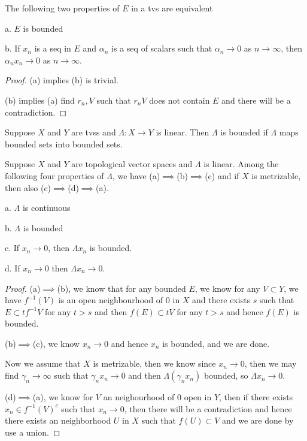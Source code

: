 \documentclass[lang=en, color=blue, ]{elegantbook}
\begin{document}
\begin{theorem}
    The following two properties of $E$ in a tvs are equivalent\par
    a. $E$ is bounded\par
    b. If $x_n$ is a seq in $E$ and $\alpha_n$ is a seq of scalars such that $\alpha_n \to 0$ as $n\to\infty$, then $\alpha_nx_n \to 0$ as $n\to\infty$.
\end{theorem}
\begin{proof}
    (a) implies (b) is trivial.\par
    (b) implies (a) find $r_n, V$ such that $r_nV$ does not contain $E$ and there will be a contradiction.
\end{proof}

\begin{definition}
    Suppose $X$ and $Y$ are tvss and $\Lambda:X\to Y$ is linear. Then $\Lambda$ is bounded if $\Lambda$ maps bounded sets into bounded sets.
\end{definition}

\begin{theorem}
    Suppose $X$ and $Y$ are topological vector spaces and $\Lambda$ is linear. Among the following four properties of $\Lambda$, we have (a)$\implies$(b)$\implies$(c) and if $X$ is metrizable, then also (c)$\implies$(d)$\implies$(a).\par
    a. $\Lambda$ is continuous\par
    b. $\Lambda$ is bounded\par
    c. If $x_n \to 0$, then $\Lambda x_n$ is bounded.\par
    d. If $x_n \to 0$ then $\Lambda x_n \to 0$. 
\end{theorem}
\begin{proof}
    (a)$\implies$(b), we know that for any bounded $E$, we know for any $V \subset Y$, we have $f^{-1}(V)$ is an open neighbourhood of $0$ in $X$ and there exists $s$ such that $E\subset tf^{-1}V$ for any $t>s$ and then $f(E)\subset tV$ for any $t>s$ and hence $f(E)$ is bounded.\par
    (b)$\implies$(c), we know $x_n \to 0$ and hence $x_n$ is bounded, and we are done.\par
    Now we assume that $X$ is metrizable, then we know since $x_n \to 0$, then we may find $\gamma_n \to \infty$ such that $\gamma_nx_n \to 0$ and then $\Lambda(\gamma_nx_n)$ bounded, so $\Lambda x_n\to 0$.\par
    (d)$\implies$(a), we know for $V$ an neighourhood of $0$ open in $Y$, then if there exists $x_n \in f^{-1}(V)^{c}$ such that $x_n \to 0$, then there will be a contradiction and hence there exists an neighborhood $U$ in $X$ such that $f(U) \subset V$ and we are done by use a union.
\end{proof}
\end{document}
